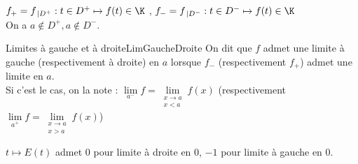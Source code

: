 \documentclass[12pt,a4paper]{report}
\begin{document}
$f_+ = f_{\: \lvert D^+} : t \in D^+ \mapsto f(t) \in \K$ , \quad $f_- = f_{\: \lvert D^-} : t \in D^- \mapsto f(t) \in \K$ \\
On a $a \not \in D^+, a \not \in D^-$.

\begin{definition}{Limites à gauche et à droite}{LimGaucheDroite}
On dit que $f$ admet une limite à gauche (respectivement à droite) en $a$ lorsque $f_-$ (respectivement $f_+$) admet une limite en $a$. \\
Si c'est le cas, on la note : $\underset{a^-}{\lim} f = \underset{\substack{x \to a \\ x < a}}{\lim} f(x)$ (respectivement $\underset{a^+}{\lim} f = \underset{\substack{x \to a \\ x > a}}{\lim} f(x)$)
\end{definition}

\begin{exemple}
$t \mapsto E(t)$ admet $0$ pour limite à droite en $0$, $-1$ pour limite à gauche en $0$.
\end{exemple}
\end{document}
